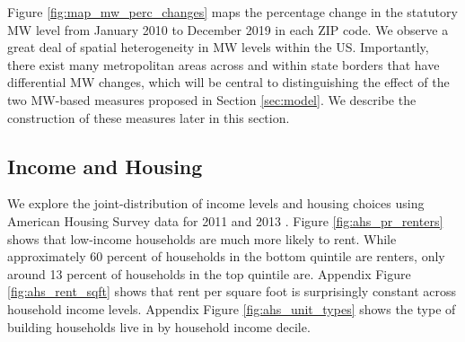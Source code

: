 Figure \ref{fig:map_mw_perc_changes} maps the percentage change in 
the statutory MW level from January 2010 to December 2019 in each ZIP code.
We observe a great deal of spatial heterogeneity in MW levels within the US.
Importantly, there exist many metropolitan areas across and within state 
borders that have differential MW changes, which will be central to 
distinguishing the effect of the two MW-based measures proposed in 
Section \ref{sec:model}.
We describe the construction of these measures later in this section.

\subsection{Income and Housing}
\label{sec:data_income_housing}

We explore the joint-distribution of income levels and housing choices using 
American Housing Survey data for 2011 and 2013 \parencite{ahs2020}.
Figure \ref{fig:ahs_pr_renters} shows that low-income households are much
more likely to rent.
While approximately 60 percent of households in the bottom quintile are renters,
only around 13 percent of households in the top quintile are.
Appendix Figure \ref{fig:ahs_rent_sqft} shows that rent per square foot is 
surprisingly constant across household income levels.
Appendix Figure \ref{fig:ahs_unit_types} shows the type of building households
live in by household income decile.

